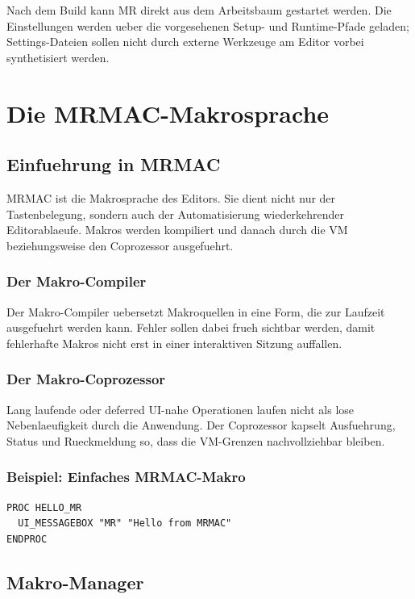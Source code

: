 \documentclass[a4paper,11pt]{report}
\newcommand{\mr}{\textsc{MR}}
\newcommand{\mrmac}{\textsc{MRMAC}}
\begin{document}
Nach dem Build kann \mr{} direkt aus dem Arbeitsbaum gestartet werden. Die
Einstellungen werden ueber die vorgesehenen Setup- und Runtime-Pfade geladen;
Settings-Dateien sollen nicht durch externe Werkzeuge am Editor vorbei
synthetisiert werden.

\chapter{Die MRMAC-Makrosprache}

\section{Einfuehrung in MRMAC}

\mrmac{} ist die Makrosprache des Editors. Sie dient nicht nur der
Tastenbelegung, sondern auch der Automatisierung wiederkehrender
Editorablaeufe. Makros werden kompiliert und danach durch die VM beziehungsweise
den Coprozessor ausgefuehrt.

\subsection{Der Makro-Compiler}

Der Makro-Compiler uebersetzt Makroquellen in eine Form, die zur Laufzeit
ausgefuehrt werden kann. Fehler sollen dabei frueh sichtbar werden, damit
fehlerhafte Makros nicht erst in einer interaktiven Sitzung auffallen.

\subsection{Der Makro-Coprozessor}

Lang laufende oder deferred UI-nahe Operationen laufen nicht als lose
Nebenlaeufigkeit durch die Anwendung. Der Coprozessor kapselt Ausfuehrung,
Status und Rueckmeldung so, dass die VM-Grenzen nachvollziehbar bleiben.

\subsection{Beispiel: Einfaches MRMAC-Makro}

\begin{verbatim}
PROC HELLO_MR
  UI_MESSAGEBOX "MR" "Hello from MRMAC"
ENDPROC
\end{verbatim}

\section{Makro-Manager}
\end{document}
